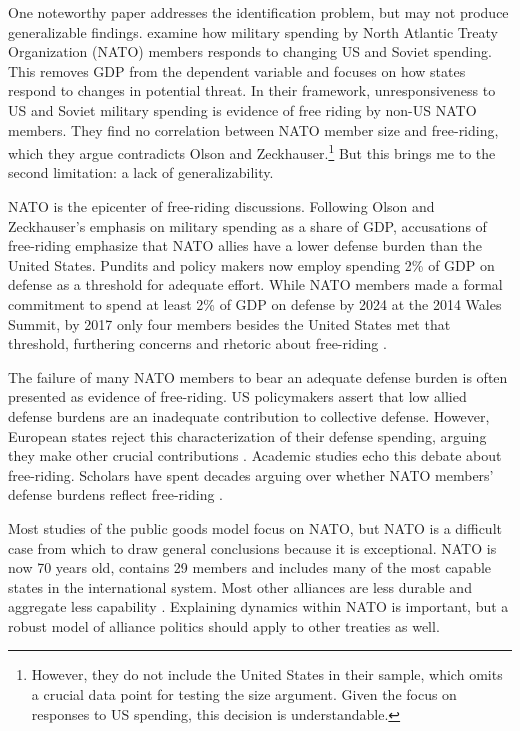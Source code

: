 \documentclass[12pt]{article}
\begin{document}
One noteworthy paper addresses the identification problem, but may not produce generalizable findings. 
\citet{PluemperNeumayer2015} examine how military spending by North Atlantic Treaty Organization (NATO) members responds to changing US and Soviet spending.
This removes GDP from the dependent variable and focuses on how states respond to changes in potential threat.  
In their framework, unresponsiveness to US and Soviet military spending is evidence of free riding by non-US NATO members.
They find no correlation between NATO member size and free-riding, which they argue contradicts Olson and Zeckhauser.\footnote{
However, they do not include the United States in their sample, which omits a crucial data point for testing the size argument. Given the focus on responses to US spending, this decision is understandable.}
But this brings me to the second limitation: a lack of generalizability. 


NATO is the epicenter of free-riding discussions. 
Following Olson and Zeckhauser's emphasis on military spending as a share of GDP, accusations of free-riding emphasize that NATO allies have a lower defense burden than the United States. 
Pundits and policy makers now employ spending 2\% of GDP on defense as a threshold for adequate effort.
While NATO members made a formal commitment to spend at least 2\% of GDP on defense by 2024 at the 2014 Wales Summit, by 2017 only four members besides the United States met that threshold, furthering concerns and rhetoric about free-riding \citep{EconomistNATO2017}. 


The failure of many NATO members to bear an adequate defense burden is often presented as evidence of free-riding. 
US policymakers assert that low allied defense burdens are an inadequate contribution to collective defense. 
However, European states reject this characterization of their defense spending, arguing they make other crucial contributions \citep{Boyer1993}. 
Academic studies echo this debate about free-riding.  
Scholars have spent decades arguing over whether NATO members' defense burdens reflect free-riding \citep{SandlerForbes1980, Palmer1990, GatesTerasawa1992, SandlerHartley2001, Lanoszka2015, PluemperNeumayer2015}.


Most studies of the public goods model focus on NATO, but NATO is a difficult case from which to draw general conclusions because it is exceptional. 
NATO is now 70 years old, contains 29 members and includes many of the most capable states in the international system. 
Most other alliances are less durable and aggregate less capability \citep{Leedsetal2002}. 
Explaining dynamics within NATO is important, but a robust model of alliance politics should apply to other treaties as well. 
\end{document}
